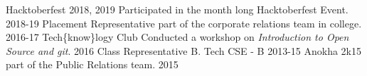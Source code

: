 \begin{cvhonors}
  \cvhonor
    {Hacktoberfest 2018, 2019}
    {Participated in the month long Hacktoberfest Event.}
    {\empty}
    {2018-19}
  \cvhonor
    {Placement Representative}
    {part of the corporate relations team in college.}
    {\empty}
    {2016-17}
  \cvhonor
    {Tech\{know\}logy Club}
    {Conducted a workshop on \textit{Introduction to Open Source and git}.}
    {}
    {2016}
 \cvhonor
    {Class Representative}
    {B. Tech CSE - B}
    {\empty}
    {2013-15}
  \cvhonor
    {Anokha 2k15}
    {part of the Public Relations team.}
    {}
    {2015}
\end{cvhonors}